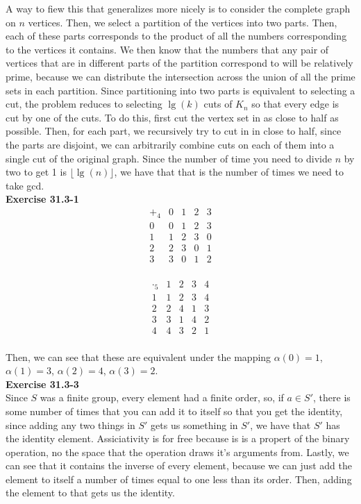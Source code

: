 \documentclass{article}
\begin{document}
 A way to fiew this that generalizes more nicely is to consider the complete graph on $n$ vertices. Then, we select a partition of the vertices into two parts. Then, each of these parts corresponds to the product of all the numbers corresponding to the vertices it contains. We then know that the numbers that any pair of vertices that are in different parts of the partition correspond to will be relatively prime, because we can distribute the intersection across the union of all the prime sets in each partition. Since partitioning into two parts is equivalent to selecting a cut, the problem reduces to selecting $\lg(k)$ cuts of $K_n$ so that every edge is cut by one of the cuts. To do this, first cut the vertex set in as close to half as possible. Then, for each part, we recursively try to cut in in close to half, since the parts are disjoint, we can arbitrarily combine cuts on each of them into a single cut of the original graph. Since the number of time you need to divide $n$ by two to get 1 is $\lfloor\lg(n)\rfloor$, we have that that is the number of times we need to take gcd.\\


\noindent\textbf{Exercise 31.3-1}\\

\[
\begin{array}{c|cccc}
+_4&0&1&2&3\\
\hline
0&0&1&2&3\\
1&1&2&3&0\\
2&2&3&0&1\\
3&3&0&1&2\\
\end{array}
\]

\[
\begin{array}{c|cccc}
\cdot_5&1&2&3&4\\
\hline
1&1&2&3&4\\
2&2&4&1&3\\
3&3&1&4&2\\
4&4&3&2&1\\
\end{array}
\]

Then, we can see that these are equivalent under the mapping $\alpha(0) =1$, $\alpha(1)= 3$, $\alpha(2) = 4$, $\alpha(3) =2$.\\



\noindent\textbf{Exercise 31.3-3}\\

Since $S$ was a finite group, every element had a finite order, so, if $a\in S'$, there is some number of times that you can add it to itself so that you get the identity, since adding any two things in $S'$ gets us something in $S'$, we have that $S'$ has the identity element. Assiciativity is for free because is is a propert of the binary operation, no the space that the operation draws it's arguments from. Lastly, we can see that it contains the inverse of every element, because we can just add the element to itself a number of times equal to one less than its order. Then, adding the element to that gets us the identity.\\
\end{document}
